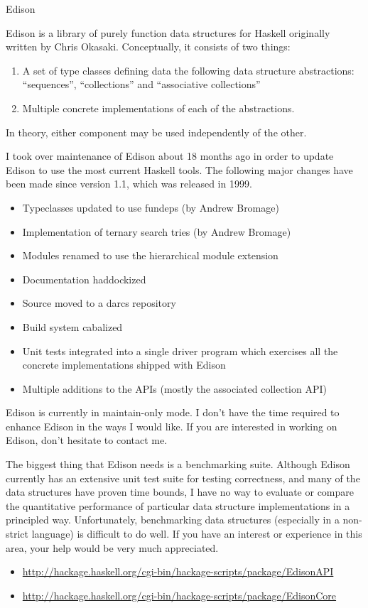 \documentclass{article}
\begin{document}
\begin{hcarentry}{Edison}
\makeheader

Edison is a library of purely function data structures for Haskell
originally written by Chris Okasaki.  Conceptually, it consists of two
things:
\begin{enumerate}
\item A set of type classes defining data the following data structure
      abstractions: ``sequences'', ``collections'' and ``associative collections''
\item Multiple concrete implementations of each of the abstractions.
\end{enumerate}


In theory, either component may be used independently of the other.

I took over maintenance of Edison about 18 months ago
in order to update Edison to use the most current Haskell tools.
The following major changes have been made since version 1.1, which
was released in 1999.

\begin{itemize}
\item Typeclasses updated to use fundeps (by Andrew Bromage)
\item Implementation of ternary search tries (by Andrew Bromage)
\item Modules renamed to use the hierarchical module extension
\item Documentation haddockized
\item Source moved to a darcs repository
\item Build system cabalized
\item Unit tests integrated into a single driver program which exercises
      all the concrete implementations shipped with Edison
\item Multiple additions to the APIs (mostly the associated collection API)
\end{itemize}


Edison is currently in maintain-only mode. I don't have the time required
to enhance Edison in the ways I would like.  If you are interested in
working on Edison, don't hesitate to contact me.

The biggest thing that Edison needs is a benchmarking suite.  Although
Edison currently has an extensive unit test suite for testing correctness,
and many of the data structures have proven time bounds,
I have no way to evaluate or compare the quantitative
performance of particular data structure implementations in a
principled way.  Unfortunately, benchmarking data structures
(especially in a non-strict language) is difficult to do well.
If you have an interest or experience in this area, your help
would be very much appreciated.

\FurtherReading
\begin{itemize}
\item \url{http://hackage.haskell.org/cgi-bin/hackage-scripts/package/EdisonAPI}
\item \url{http://hackage.haskell.org/cgi-bin/hackage-scripts/package/EdisonCore}
\end{itemize}
\end{hcarentry}
\end{document}
